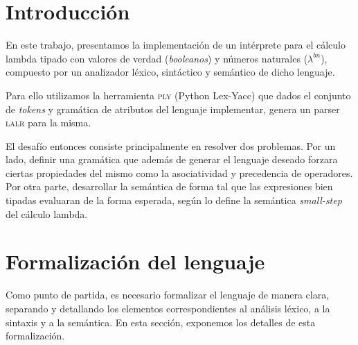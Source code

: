 \documentclass[11pt]{article}
\begin{document}

\thispagestyle{empty}
\maketitle

\newpage
\tableofcontents

\newpage


\section{Introducción}


En este trabajo, presentamos la implementación de un intérprete para el
cálculo lambda tipado con valores de verdad (\emph{booleanos}) y números
naturales ($\lambda^{bn}$)\cite{clase-plp}, compuesto por un analizador
léxico, sintáctico y semántico de dicho lenguaje.

Para ello utilizamos la herramienta \textsc{ply} (Python Lex-Yacc)
\cite{ply-docs} que dados el conjunto de \emph{tokens} y gramática de
atributos del lenguaje implementar, genera un parser \textsc{lalr} para la
misma.

El desafío entonces consiste principalmente en resolver dos problemas.
Por un lado, definir una gramática que además de generar el lenguaje deseado
forzara ciertas propiedades del mismo como la asociatividad y precedencia de
operadores.
Por otra parte, desarrollar la semántica de forma tal que las expresiones
bien tipadas evaluaran de la forma esperada, según lo define la semántica
\emph{small-step} del cálculo lambda.


\section{Formalización del lenguaje}


Como punto de partida, es necesario formalizar el lenguaje de manera clara,
separando y detallando los elementos correspondientes al análisis léxico,
a la sintaxis y a la semántica. En esta sección, exponemos los detalles de
esta formalización.
\end{document}
